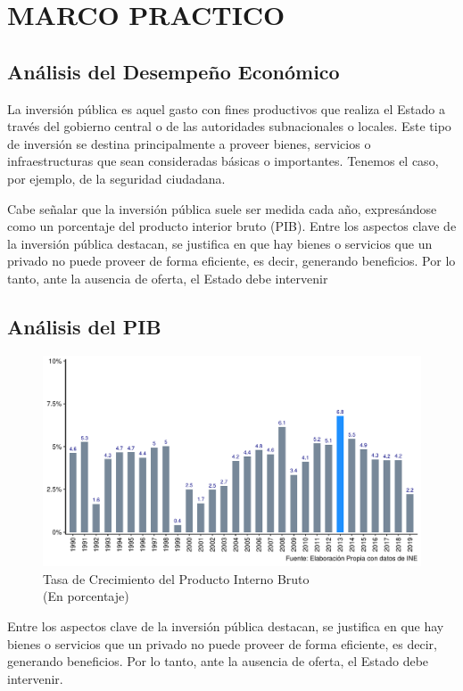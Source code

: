 \chapter{MARCO PRACTICO}
\section{Análisis del Desempeño Económico}
La inversión pública es aquel gasto con fines productivos que realiza el Estado a través del gobierno central o de las autoridades subnacionales o locales. Este tipo de inversión se destina principalmente a proveer bienes, servicios o infraestructuras que sean consideradas básicas o importantes. Tenemos el caso, por ejemplo, de la seguridad ciudadana.

Cabe señalar que la inversión pública suele ser medida cada año, expresándose como un porcentaje del producto interior bruto (PIB). Entre los aspectos clave de la inversión pública destacan, se justifica en que hay bienes o servicios que un privado no puede proveer de forma eficiente, es decir, generando beneficios. Por lo tanto, ante la ausencia de oferta, el Estado debe intervenir 

\section{Análisis del PIB}
\begin{figure}[!h]
	\centering
\caption{\label{fig:Pib}Tasa de Crecimiento del Producto Interno Bruto\\ (En porcentaje)}
	\includegraphics[scale=0.7]{Imagenes/pib_real_tasa.pdf}	
\end{figure}

Entre los aspectos clave de la inversión pública destacan, se justifica en que hay bienes o servicios que un privado no puede proveer de forma eficiente, es decir, generando beneficios. Por lo tanto, ante la ausencia de oferta, el Estado debe intervenir.

